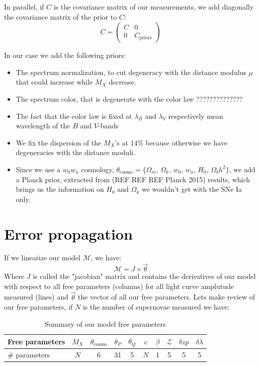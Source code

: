\documentclass[\docopts]{\docclass}
\begin{document}
In parallel, if $C$ is the covariance matrix of our measurements, we add diagonally the covariance matrix of the prior to $C$:
\begin{equation}
C =
\begin{pmatrix}
  C & 0 \\
  0 & C_\text{priors}
\end{pmatrix} 
\end{equation}

In our case we add the following priors:
\begin{itemize}
\item The spectrum normalization, to cut degeneracy with the distance modulus $\mu$ that could increase while $M_X$ decrease.
\item The spectrum color, that is degenerate with the color law ??????????????
\item The fact that the color law is fixed at $\lambda_B$ and $\lambda_V$ respectively mean wavelength of the $B$ and $V$-bands
\item We fix the dispersion of the $M_X$'s at 14\% because otherwise we have degeneracies with the distance moduli.
\item Since we use a $w_0w_a$ cosmology, $\theta_\text{cosmo} = \{ \Omega_m$, $\Omega_k$, $w_0$, $w_a$, $H_0$, $\Omega_bh^2 \}$, we add a Planck prior, extracted from (REF REF REF Planck 2015) results, which brings us the information on $H_0$ and $\Omega_k$ we wouldn't get with the SNe Ia only.
\end{itemize}



\section{Error propagation}
\label{sec::linalg}

If we linearize our model $\mathcal{M}$, we have:
\begin{equation}
\mathcal{M} = J \times \vec\theta
\end{equation}
Where $J$ is called the "jacobian" matrix and contains the derivatives of our model with respect to all free parameters (columns) for all light curve amplutude measured (lines) and $\vec\theta$ the vector of all our free parameters.
Lets make review of our free parameters, if $N$ is the number of supernovae measured we have:

\begin{table}[t]
\begin{center}
\caption{Summary of our model free parameters}
\begin{tabular}{l|ccccccccc}
\hline
\hline
Free parameters & $M_X$ & $\theta_\text{cosmo}$ & $\theta_P$ & $\theta_Q$ & $c$ & $\beta$ & $\mathcal{Z}$ & $\delta zp$ & $\delta \lambda$ \\
\hline
\# parameters & $N$ & 6 & 31 & 5 & $N$ & 1 & 5 & 5 & 5 \\
\hline
\end{tabular}
\end{center}
\end{table}
\end{document}
